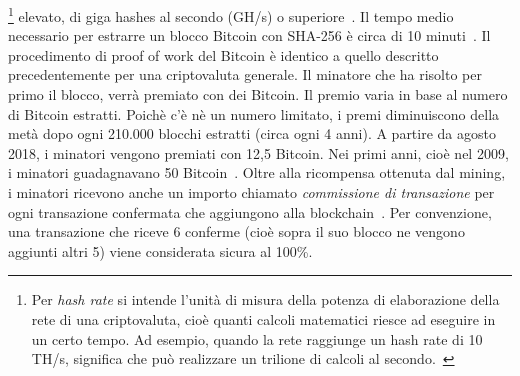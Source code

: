\footnote{Per \textit{hash rate} si intende l'unità di misura della potenza di elaborazione della rete di una criptovaluta, cio\`e quanti calcoli matematici riesce ad eseguire in un certo tempo. Ad esempio, quando la rete raggiunge un hash rate di 10 TH/s, significa che può realizzare un trilione di calcoli al secondo.~\cite{sito:bitcoin}} elevato, di giga hashes al secondo (GH/s) o superiore~\cite{art:bc1}. 
Il tempo medio necessario per estrarre un blocco Bitcoin con SHA-256 \`e circa di 10 minuti~\cite{sito:bitcoin}.
Il procedimento di proof of work del Bitcoin \`e identico a quello descritto precedentemente per una criptovaluta generale.
Il minatore che ha risolto per primo il blocco, verrà premiato con dei Bitcoin. Il premio varia in base al numero di Bitcoin estratti. Poich\`e c'\`e n\`e un numero limitato, i premi diminuiscono della metà dopo ogni 210.000 blocchi estratti (circa ogni 4 anni). A partire da agosto 2018, i minatori vengono premiati con 12,5 Bitcoin. Nei primi anni, cio\`e nel 2009, i minatori guadagnavano 50 Bitcoin~\cite{art:bc2}.
Oltre alla ricompensa ottenuta dal mining, i minatori ricevono anche un importo chiamato \textit{commissione di transazione} per ogni transazione confermata che aggiungono alla blockchain~\cite{art:bc1}.
Per convenzione, una transazione che riceve 6 conferme (cio\`e sopra il suo blocco ne vengono aggiunti altri 5) viene considerata sicura al 100\%.

